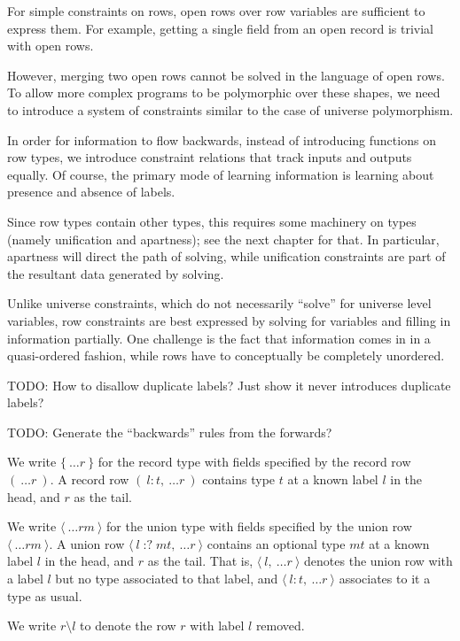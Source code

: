\documentclass[11pt, twoside, reqno]{book}
\providecommand{\lcurvyangle}{\langle}
\providecommand{\rcurvyangle}{\rangle}
\begin{document}
For simple constraints on rows, open rows over row variables are sufficient to express them.
For example, getting a single field from an open record is trivial with open rows.

However, merging two open rows cannot be solved in the language of open rows.
To allow more complex programs to be polymorphic over these shapes, we need to introduce a system of constraints similar to the case of universe polymorphism.

In order for information to flow backwards, instead of introducing functions on row types, we introduce constraint relations that track inputs and outputs equally.
Of course, the primary mode of learning information is learning about presence and absence of labels.

Since row types contain other types, this requires some machinery on types (namely unification and apartness); see the next chapter for that.
In particular, apartness will direct the path of solving, while unification constraints are part of the resultant data generated by solving.

Unlike universe constraints, which do not necessarily “solve” for universe level variables, row constraints are best expressed by solving for variables and filling in information partially.
One challenge is the fact that information comes in in a quasi-ordered fashion, while rows have to conceptually be completely unordered.

TODO: How to disallow duplicate labels?
Just show it never introduces duplicate labels?

TODO: Generate the ``backwards'' rules from the forwards?

We write $\{\ \dots\!r\ \}$ for the record type with fields specified by the record row $(\ \dots\!r\ )$.
A record row $(\ l : t,\ \dots\!r\ )$ contains type $t$ at a known label $l$ in the head, and $r$ as the tail.

We write $\langle\ \dots\!\mathit{rm}\ \rangle$ for the union type with fields specified by the union row $\lcurvyangle\ \dots\!\mathit{rm}\ \rcurvyangle$.
A union row $\lcurvyangle\ l \mathop{{:}{?}} \mathit{mt},\ \dots\!r\ \rcurvyangle$ contains an optional type $\mathit{mt}$ at a known label $l$ in the head, and $r$ as the tail.
That is, $\lcurvyangle\ l,\ \dots\!r\ \rcurvyangle$ denotes the union row with a label $l$ but no type associated to that label, and $\lcurvyangle\ l : t,\ \dots\!r\ \rcurvyangle$ associates to it a type as usual.

We write $r \setminus l$ to denote the row $r$ with label $l$ removed.
\end{document}
